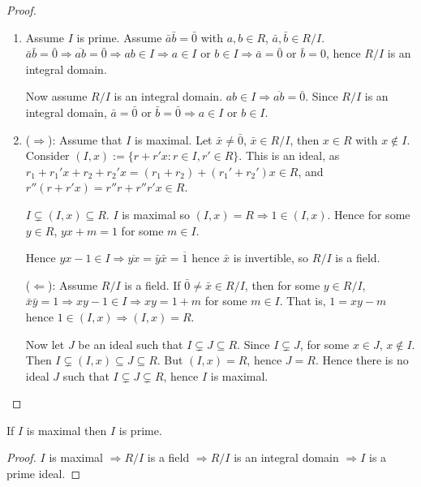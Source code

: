 \begin{proof}
	\hfill
	\begin{enumerate}
		\item Assume $I$ is prime. Assume $\bar{a}\bar{b} = \bar{0}$ with $a, b \in R$, $\bar{a}, \bar{b} \in R / I$. $\bar{a}\bar{b} = \bar{0} \Rightarrow \overline{ab} = \bar{0} \Rightarrow ab \in I \Rightarrow a \in I \text{ or } b \in I \Rightarrow \bar{a} = \bar{0} \text{ or } \bar{b} = {0}$, hence $R / I$ is an integral domain.
		
		Now assume $R / I$ is an integral domain. $ab \in I \Rightarrow \overline{ab} = \bar{0}$. Since $R / I$ is an integral domain, $\bar{a} = \bar{0}$ or $\bar{b} = \bar{0} \Rightarrow a \in I \text{ or } b \in I$.

		\item ($\Rightarrow$): Assume that $I$ is maximal. Let $\bar{x} \ne \bar{0}$, $\bar{x} \in R / I$, then $x \in R$ with $x \notin I$. Consider $(I, x) := \{ r + r'x: r \in I, r' \in R \}$. This is an ideal, as $r_1 + r_1' x + r_2 + r_2'x = (r_1 + r_2) + (r_1' + r_2')x \in R$, and $r'' (r + r'x) = r''r + r''r'x \in R$.
		
		$I \subsetneq (I, x) \subseteq R$. $I$ is maximal so $(I, x) = R \Rightarrow 1 \in (I, x)$. Hence for some $y \in R$, $yx + m = 1$ for some $m \in I$.

		Hence $yx - 1 \in I \Rightarrow \overline{yx} = \bar{y}\bar{x} = \overline{1}$ hence $\bar{x}$ is invertible, so $R / I$ is a field.

		($\Leftarrow$): Assume $R / I$ is a field. If $\bar{0} \ne \bar{x} \in R / I$, then for some $y \in R / I$, $\bar{x} \bar{y} = 1 \Rightarrow xy - 1 \in I \Rightarrow xy = 1 + m$ for some $m \in I$. That is, $1 = xy - m$ hence $1 \in (I, x) \Rightarrow (I, x) = R$.

		Now let $J$ be an ideal such that $I \subsetneq J \subseteq R$. Since $I \subsetneq J$, for some $x \in J$, $x \notin I$. Then $I \subsetneq (I, x) \subseteq J \subseteq R$. But $(I, x) = R$, hence $J = R$. Hence there is no ideal $J$ such that $I \subsetneq J \subsetneq R$, hence $I$ is maximal.
	\end{enumerate}
\end{proof}

\begin{corollary}
	If $I$ is maximal then $I$ is prime.
\end{corollary}

\begin{proof}
	$I$ is maximal $\Rightarrow R / I$ is a field $\Rightarrow R / I$ is an integral domain $\Rightarrow I$ is a prime ideal.
\end{proof}

